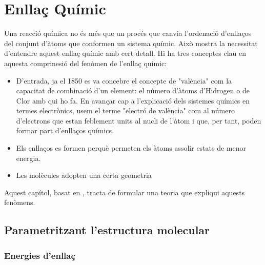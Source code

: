 \chapter{Enllaç Químic}

Una reacció química no és més que un procés que canvia l'ordenació d'enllaços del conjunt d'àtoms que conformen un sistema químic.
Això mostra la necessitat d'entendre aquest enllaç químic amb cert detall.
Hi ha tres conceptes clau en aquesta comprinesió del fenòmen de l'enllaç químic:
\begin{itemize}
\item D'entrada, ja el 1850 es va concebre el concepte de "valència" com la capacitat de combinació d'un element: el número d'àtoms d'Hidrogen o de Clor amb qui ho fa. 
En avançar cap a l'explicació dels sistemes químics en termes electrònics, usem el terme "electró de valència" com al número d'electrons que estan feblement units al nucli de l'àtom i que, per tant, poden formar part d'enllaços químics.
\item Els enllaços es formen perquè permeten els àtoms assolir estats de menor energia.
\item Les molècules adopten una certa geometria
\end{itemize}

Aquest capítol, basat en \cite{mahan_quimico_1977}, tracta de formular una teoria que expliqui aquests fenòmens.

\section{Parametritzant l'estructura molecular}

\subsection{Energies d'enllaç}

